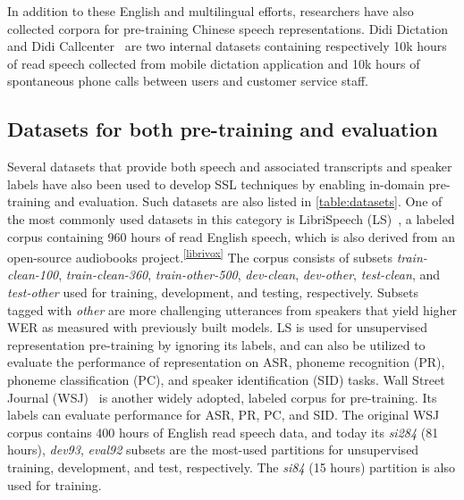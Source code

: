 In addition to these English and multilingual efforts, researchers have also
collected corpora for pre-training Chinese speech representations. Didi Dictation
and Didi Callcenter~\parencite{jiang_improving_2019, jiang_further_2021} are two
internal datasets containing respectively 10k hours of read speech collected
from mobile dictation application and 10k hours of spontaneous phone calls
between users and customer service staff.

\subsection{Datasets for both pre-training and evaluation}\label{sec:datasets}
Several datasets that provide both speech and associated transcripts and
speaker labels have also been used to develop SSL techniques by enabling
in-domain pre-training and evaluation. Such datasets are also listed in
\cref{table:datasets}. One of the most commonly used datasets in this category
is LibriSpeech (LS)~\parencite{panayotov_librispeech_2015}, a labeled corpus
containing 960 hours of
read English speech, which is also derived from an open-source audiobooks
project.\textsuperscript{\ref{librivox}} The corpus consists of subsets
\textit{train-clean-100}, \textit{train-clean-360}, \textit{train-other-500},
\textit{dev-clean}, \textit{dev-other}, \textit{test-clean}, and
\textit{test-other} used for training, development, and testing, respectively.
Subsets tagged with \textit{other} are more challenging utterances from
speakers that yield higher WER as measured with previously built models. LS is
used for unsupervised representation pre-training by ignoring its labels, and
can also be utilized to evaluate the performance of representation on ASR, phoneme recognition (PR),
phoneme classification (PC), and speaker identification (SID) tasks. Wall Street Journal (WSJ)~\parencite{paul_design_1992} is another
widely adopted, labeled corpus for pre-training. Its labels can evaluate
performance for ASR, PR, PC, and SID. The original WSJ corpus contains 400 hours
of English read speech data, and today its \textit{si284} (81 hours),
\textit{dev93}, \textit{eval92} subsets are the most-used partitions for
unsupervised training, development, and test, respectively.  The \textit{si84}
(15 hours) partition is also used for training.

